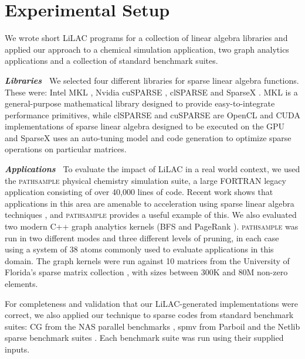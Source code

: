 \section{Experimental Setup}
\label{sec:experimentalsetup}
We wrote short  LiLAC  programs for a collection of
linear algebra libraries 
and applied our approach  to a chemical
simulation application, two graph analytics applications and a collection of
standard benchmark suites.

\vspace{0.25em}
\noindent
{\bf\em Libraries\ }
We selected four different libraries for sparse linear algebra
functions. These were: Intel MKL \cite{mkl}, Nvidia cuSPARSE \cite{cusparse},
clSPARSE \cite{clsparse} and SparseX \cite{sparsex}. MKL is a general-purpose
mathematical library designed to provide easy-to-integrate performance
primitives, while clSPARSE and cuSPARSE are OpenCL and CUDA implementations of
sparse linear algebra designed to be executed on the GPU and SparseX uses an
auto-tuning model and code generation to optimize sparse operations on
particular matrices.

\vspace{0.25em}
\noindent
{\bf\em Applications\ }
To evaluate the impact of LiLAC in a real world context, we used the
\textsc{pathsample} physical chemistry simulation suite, a large FORTRAN legacy
application \cite{doi:10.1080/00268970210162691} consisting of over 40,000 lines
of code.
Recent work shows that applications in this area are amenable to acceleration
using sparse linear algebra techniques \cite{SUTHERLANDCASH2017288}, and
\textsc{pathsample} provides a useful example of this.
We also evaluated two modern C++ graph analytics kernels (BFS and PageRank
\cite{demetrescu2009shortest,Beamer2015GAP}).
\textsc{pathsample} was run in two different modes and three different levels of
pruning, in each case using a system of 38 atoms \cite{doi:10.1063/1.478595}
commonly used to evaluate applications in this domain.
The graph kernels were run against 10 matrices from the University of Florida's
sparse matrix collection \cite{Davis:2011:UFS:2049662.2049663}, with sizes
between 300K and 80M non-zero elements.

\vspace{0.25em}
\noindent
For completeness and validation that our LiLAC-generated implementations were
correct, we also applied our technique to sparse codes from standard benchmark
suites: CG from the NAS parallel benchmarks \cite{Bailey1991NPB}, spmv from
Parboil \cite{Stratton2018} and the Netlib sparse benchmark suites
\cite{Dongarra2001}.
Each benchmark suite was run using their supplied inputs.

